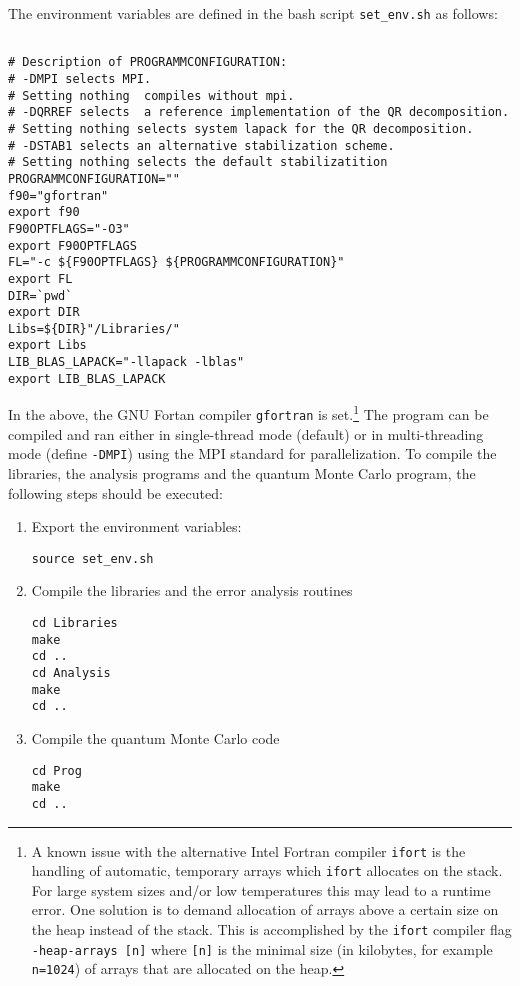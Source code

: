 The environment variables are defined in the bash script \texttt{set\_env.sh} as follows:
\lstset{style=bash}
\begin{lstlisting}

# Description of PROGRAMMCONFIGURATION:
# -DMPI selects MPI.
# Setting nothing  compiles without mpi.
# -DQRREF selects  a reference implementation of the QR decomposition. 
# Setting nothing selects system lapack for the QR decomposition.
# -DSTAB1 selects an alternative stabilization scheme.
# Setting nothing selects the default stabilizatition
PROGRAMMCONFIGURATION=""
f90="gfortran"
export f90
F90OPTFLAGS="-O3"
export F90OPTFLAGS
FL="-c ${F90OPTFLAGS} ${PROGRAMMCONFIGURATION}"
export FL
DIR=`pwd`
export DIR
Libs=${DIR}"/Libraries/"
export Libs
LIB_BLAS_LAPACK="-llapack -lblas"
export LIB_BLAS_LAPACK

\end{lstlisting}
In the above, the GNU Fortan compiler \texttt{gfortran} is set.\footnote{A known issue with the alternative Intel Fortran compiler \texttt{ifort} is the handling of automatic, temporary arrays 
which \texttt{ifort} allocates on the stack. For large system sizes and/or low temperatures this may lead to 
a runtime error. One solution is to demand allocation of arrays above a certain size on the heap instead of the stack. 
This is accomplished by the \texttt{ifort} compiler flag \texttt{-heap-arrays [n]} where \texttt{[n]} is the minimal size (in kilobytes, for example \texttt{n=1024}) of arrays 
that are allocated on the heap.}
The program can be compiled and ran either in single-thread mode (default) or 
in multi-threading mode (define \texttt{-DMPI}) using the MPI standard for parallelization.
To compile the libraries, the analysis programs and the quantum Monte Carlo program, the following steps should be executed:
\begin{enumerate}
\item Export  the environment variables:
\begin{verbatim}
source set_env.sh
\end{verbatim}
\item Compile the libraries and the error analysis routines
\begin{verbatim}
cd Libraries
make
cd ..
cd Analysis
make
cd ..
\end{verbatim}
\item Compile the quantum Monte Carlo code
\begin{verbatim}
cd Prog
make
cd ..
\end{verbatim}
\end{enumerate}

